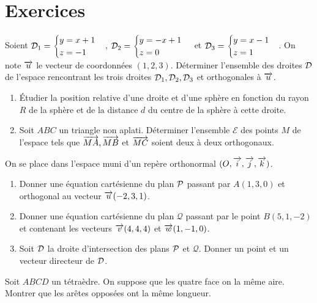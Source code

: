 \section{Exercices}
\begin{exercice}
    Soient \(\Dr_1 = \begin{cases} y = x+1 \\z = -1 \end{cases}\), \(\Dr_2 = \begin{cases} y = -x+1 \\z = 0 \end{cases}\) et \(\Dr_3 = \begin{cases} y = x-1 \\z = 1 \end{cases}\). On note \(\vu\) le vecteur de coordonnées \((1,2,3)\). Déterminer l'ensemble des droites \(\Dr\) de l'espace rencontrant les trois droites \(\Dr_1, \Dr_2, \Dr_3\) et orthogonales à \(\vu\).
\end{exercice}
\begin{exercice}
    \begin{enumerate}
        \item Étudier la position relative d'une droite et d'une sphère en fonction du rayon \(R\) de la sphère et de la distance \(d\) du centre de la sphère à cette droite.
        \item Soit \(ABC\) un triangle non aplati. Déterminer l'ensemble \(\mathcal{E}\) des points \(M\) de l'espace tels que \(\vect{MA}, \vect{MB}\) et  \(\vect{MC}\) soient deux à deux orthogonaux.
    \end{enumerate}
\end{exercice}
\begin{exercice}
    On se place dans l'espace muni d'un repère orthonormal \((O, \vi, \vj, \vk)\).
    \begin{enumerate}
        \item Donner une équation cartésienne du plan \(\P\) passant par \(A(1,3,0)\) et orthogonal au vecteur \(\vu(-2,3,1)\).
        \item Donner une équation cartésienne du plan \(\mathcal{Q}\) passant par le point \(B(5,1,-2)\) et contenant les vecteurs \(\vv(4,4,4)\) et \(\vw(1, -1, 0)\).
        \item Soit \(\Dr\) la droite d'intersection des plans \(\P\) et \(\mathcal{Q}\). Donner un point et un vecteur directeur de \(\Dr\).
    \end{enumerate}
\end{exercice}
\begin{exercice}
    Soit \(ABCD\) un tétraèdre. On suppose que les quatre face on la même aire. Montrer que les arêtes opposées ont la même longueur.
\end{exercice}
